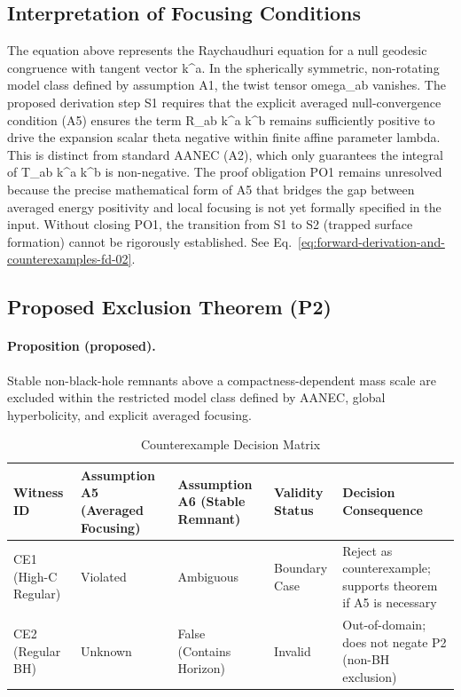 \documentclass[conference]{IEEEtran}
\begin{document}
\subsection{Interpretation of Focusing Conditions}
The equation above represents the Raychaudhuri equation for a null geodesic congruence with tangent vector k\textasciicircum{}a. In the spherically symmetric, non-rotating model class defined by assumption A1, the twist tensor omega\_ab vanishes. The proposed derivation step S1 requires that the explicit averaged null-convergence condition (A5) ensures the term R\_ab k\textasciicircum{}a k\textasciicircum{}b remains sufficiently positive to drive the expansion scalar theta negative within finite affine parameter lambda. This is distinct from standard AANEC (A2), which only guarantees the integral of T\_ab k\textasciicircum{}a k\textasciicircum{}b is non-negative. The proof obligation PO1 remains unresolved because the precise mathematical form of A5 that bridges the gap between averaged energy positivity and local focusing is not yet formally specified in the input. Without closing PO1, the transition from S1 to S2 (trapped surface formation) cannot be rigorously established. See Eq.~\eqref{eq:forward-derivation-and-counterexamples-fd-02}.~\cite{cite_0ed84243cf171bc4}

\subsection{Proposed Exclusion Theorem (P2)}
\paragraph{Proposition (proposed).} Stable non-black-hole remnants above a compactness-dependent mass scale are excluded within the restricted model class defined by AANEC, global hyperbolicity, and explicit averaged focusing.

\begin{table}[htbp]
\centering
\footnotesize
\setlength{\tabcolsep}{3pt}
\renewcommand{\arraystretch}{1.12}
\caption{Counterexample Decision Matrix}
\label{tab:forward-derivation-and-counterexamples-fd-05}
\begin{tabular}{|p{}|p{}|p{}|p{}|p{}|}
\hline
Witness ID & Assumption A5 (Averaged Focusing) & Assumption A6 (Stable Remnant) & Validity Status & Decision Consequence \\\hline
CE1 (High-C Regular) & Violated & Ambiguous & Boundary Case & Reject as counterexample; supports theorem if A5 is necessary \\\hline
CE2 (Regular BH) & Unknown & False (Contains Horizon) & Invalid & Out-of-domain; does not negate P2 (non-BH exclusion) \\\hline
\end{tabular}
\end{table}
\end{document}
